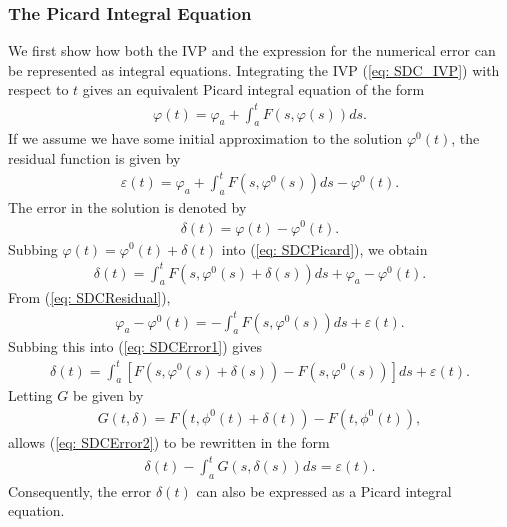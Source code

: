 \documentclass{sfuthesis}
\begin{document}
\subsubsection{The Picard Integral Equation}
We first show how both the IVP and the expression for the numerical error can be represented as integral equations. 
Integrating the IVP (\ref{eq: SDC_IVP}) with respect to $t$ gives an equivalent Picard integral equation of the form
\begin{align}
	\varphi(t)=\varphi_a +\int_a^t F(s, \varphi(s))ds. \label{eq: SDCPicard}
\end{align}
If we assume we have some initial approximation to the solution $\varphi^0(t)$, the residual function is given by 
\begin{align}
	\varepsilon(t)=\varphi_a +\int_a^t F(s, \varphi^0(s))ds -\varphi^0(t). \label{eq: SDCResidual} 
\end{align}
The error in the solution is denoted by 
\begin{align*}
	\delta(t)=\varphi(t)-\varphi^0(t).
\end{align*}
Subbing $\varphi(t)=\varphi^0(t)+\delta(t)$ into (\ref{eq: SDCPicard}), we obtain
\begin{align}
	\delta(t)=\int_a^t F(s, \varphi^0(s)+\delta(s))ds + \varphi_a-\varphi^0(t). \label{eq: SDCError1} 
\end{align}
From (\ref{eq: SDCResidual}), 
\begin{align*}
	\varphi_a- \varphi^0(t)= -\int_a^t F(s, \varphi^0(s))ds +\varepsilon(t).
\end{align*}
Subbing this into (\ref{eq: SDCError1}) gives 
\begin{align}
	\delta(t)=\int_a^t \left[ F(s, \varphi^0(s)+\delta(s))-F(s,\varphi^0(s)) \right]ds +\varepsilon(t). \label{eq: SDCError2} 
\end{align}
Letting $G$ be given by 
\begin{align*}
	G(t, \delta)=F(t, \phi^0(t)+\delta(t))-F(t, \phi^0(t)), 
\end{align*}
allows (\ref{eq: SDCError2}) to be rewritten in the form 
\begin{align}
	\delta(t)-\int_a^t G(s, \delta(s))ds= \varepsilon(t). \label{eq: SDCError3} 
\end{align}
Consequently, the error $\delta(t)$ can also be expressed as a Picard integral equation. 

\end{document}
